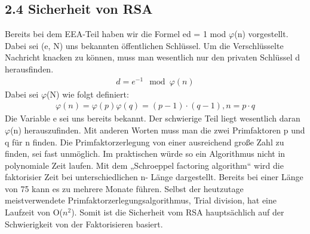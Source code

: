 \documentclass[course=asp]{aspdoc}
\begin{document}
\subsection*{2.4 Sicherheit von RSA}
Bereits bei dem EEA-Teil haben wir die Formel ed = 1 mod $\varphi $(n) vorgestellt.  Dabei sei (e, N) uns bekannten öffentlichen Schlüssel. Um die Verschlüsselte Nachricht knacken zu können, muss man wesentlich nur den privaten Schlüssel d herausfinden. 
\begin{align}
	d = e^{-1} \mod \varphi (n)
\end{align}
Dabei sei $\varphi $(N) wie folgt definiert:
\begin{align}
	\varphi (n) = \varphi (p)\varphi (q) = (p-1) \cdot (q-1), n = p \cdot q
\end{align}
Die Variable e sei uns bereits bekannt. Der schwierige Teil liegt wesentlich daran $\varphi $(n) herauszufinden. Mit anderen Worten muss man die zwei Primfaktoren p und q für n finden. Die Primfaktorzerlegung von einer ausreichend große Zahl zu finden, sei fast unmöglich. Im praktischen würde so ein Algorithmus nicht in polynomiale Zeit laufen. Mit dem „Schroeppel factoring algorithm“ wird die faktorisier Zeit bei unterschiedlichen n- Länge dargestellt. Bereits bei einer Länge von 75 kann es zu mehrere Monate führen. Selbst der heutzutage meistverwendete Primfaktorzerlegungsalgorithmus, Trial division, hat eine Laufzeit von O($n^{2}$). Somit ist die Sicherheit vom RSA hauptsächlich auf der Schwierigkeit von der Faktorisieren basiert.
\end{document}
